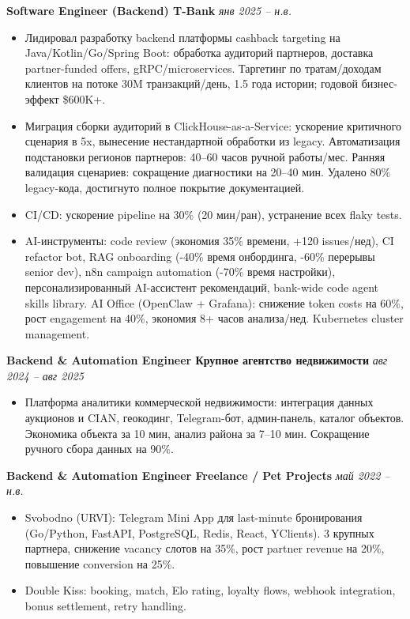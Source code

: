 \documentclass[10pt,a4paper]{article}
\begin{document}
\textbf{Software Engineer (Backend) \textbar{} T-Bank} \hfill \textit{янв 2025 -- н.в.}
\begin{itemize}
  \item Лидировал разработку backend платформы cashback targeting на Java/Kotlin/Go/Spring Boot: обработка аудиторий партнеров, доставка partner-funded offers, gRPC/microservices. Таргетинг по тратам/доходам клиентов на потоке 30M транзакций/день, 1.5 года истории; годовой бизнес-эффект \$600K+.
  \item Миграция сборки аудиторий в ClickHouse-as-a-Service: ускорение критичного сценария в 5x, вынесение нестандартной обработки из legacy. Автоматизация подстановки регионов партнеров: 40--60 часов ручной работы/мес. Ранняя валидация сценариев: сокращение диагностики на 20--40 мин. Удалено 80\% legacy-кода, достигнуто полное покрытие документацией.
  \item CI/CD: ускорение pipeline на 30\% (20 мин/ран), устранение всех flaky tests.
  \item AI-инструменты: code review (экономия 35\% времени, +120 issues/нед), CI refactor bot, RAG onboarding (-40\% время онбординга, -60\% перерывы senior dev), n8n campaign automation (-70\% время настройки), персонализированный AI-ассистент рекомендаций, bank-wide code agent skills library. AI Office (OpenClaw + Grafana): снижение token costs на 60\%, рост engagement на 40\%, экономия 8+ часов анализа/нед. Kubernetes cluster management.
\end{itemize}

\textbf{Backend \& Automation Engineer \textbar{} Крупное агентство недвижимости} \hfill \textit{авг 2024 -- авг 2025}
\begin{itemize}
  \item Платформа аналитики коммерческой недвижимости: интеграция данных аукционов и CIAN, геокодинг, Telegram-бот, админ-панель, каталог объектов. Экономика объекта за 10 мин, анализ района за 7--10 мин. Сокращение ручного сбора данных на 90\%.
\end{itemize}

\textbf{Backend \& Automation Engineer \textbar{} Freelance / Pet Projects} \hfill \textit{май 2022 -- н.в.}
\begin{itemize}
  \item Svobodno (URVI): Telegram Mini App для last-minute бронирования (Go/Python, FastAPI, PostgreSQL, Redis, React, YClients). 3 крупных партнера, снижение vacancy слотов на 35\%, рост partner revenue на 20\%, повышение conversion на 25\%.
  \item Double Kiss: booking, match, Elo rating, loyalty flows, webhook integration, bonus settlement, retry handling.
\end{itemize}
\end{document}
